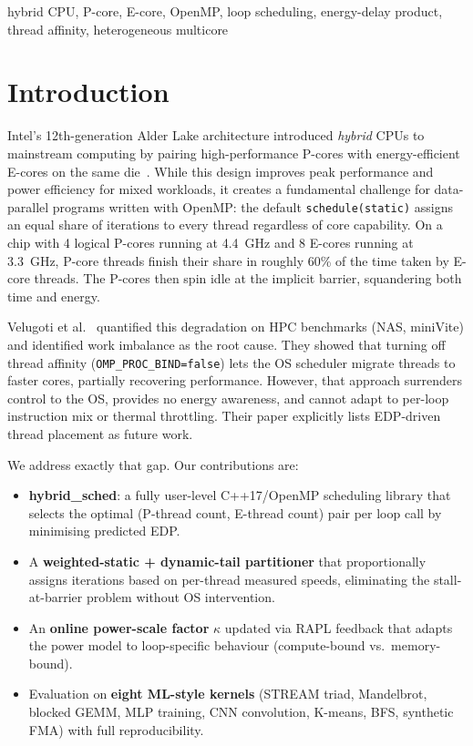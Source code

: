 \documentclass[conference]{IEEEtran}
\begin{document}
\begin{IEEEkeywords}
hybrid CPU, P-core, E-core, OpenMP, loop scheduling, energy-delay product,
thread affinity, heterogeneous multicore
\end{IEEEkeywords}

\section{Introduction}

Intel's 12th-generation Alder Lake architecture introduced
\textit{hybrid} CPUs to mainstream computing by pairing high-performance
P-cores with energy-efficient E-cores on the same die~\cite{velugoti2026}.
While this design improves peak performance and power efficiency for
mixed workloads, it creates a fundamental challenge for data-parallel
programs written with OpenMP: the default \texttt{schedule(static)}
assigns an equal share of iterations to every thread regardless of
core capability.
On a chip with 4 logical P-cores running at 4.4~GHz and 8 E-cores
running at 3.3~GHz, P-core threads finish their share in roughly
60\% of the time taken by E-core threads.
The P-cores then spin idle at the implicit barrier, squandering both
time and energy.

Velugoti et al.~\cite{velugoti2026} quantified this degradation on
HPC benchmarks (NAS, miniVite) and identified work imbalance as the
root cause.
They showed that turning off thread affinity (\texttt{OMP\_PROC\_BIND=false})
lets the OS scheduler migrate threads to faster cores, partially
recovering performance.
However, that approach surrenders control to the OS, provides no
energy awareness, and cannot adapt to per-loop instruction mix or
thermal throttling.
Their paper explicitly lists EDP-driven thread placement as future work.

We address exactly that gap.
Our contributions are:
\begin{itemize}
  \item \textbf{hybrid\_sched}: a fully user-level C++17/OpenMP scheduling
        library that selects the optimal (P-thread count, E-thread count)
        pair per loop call by minimising predicted EDP.
  \item A \textbf{weighted-static + dynamic-tail partitioner} that
        proportionally assigns iterations based on per-thread measured
        speeds, eliminating the stall-at-barrier problem without OS intervention.
  \item An \textbf{online power-scale factor} $\kappa$ updated via RAPL
        feedback that adapts the power model to loop-specific behaviour
        (compute-bound vs.\ memory-bound).
  \item Evaluation on \textbf{eight ML-style kernels} (STREAM triad,
        Mandelbrot, blocked GEMM, MLP training, CNN convolution, K-means,
        BFS, synthetic FMA) with full reproducibility.
\end{itemize}
\end{document}

